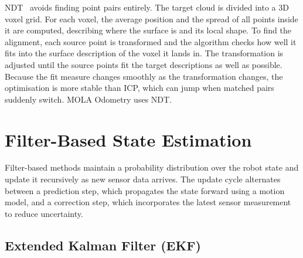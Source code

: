 NDT~\cite{biber2003ndt} avoids finding point pairs entirely.
The target cloud is divided into a 3D voxel grid.
For each voxel, the average position and the spread of all points inside it
are computed, describing where the surface is and its local shape.
To find the alignment, each source point is transformed and the algorithm
checks how well it fits into the surface description of the voxel it lands in.
The transformation is adjusted until the source points fit the target
descriptions as well as possible.
Because the fit measure changes smoothly as the transformation changes, the
optimisation is more stable than ICP, which can jump when matched pairs
suddenly switch.
MOLA Odometry uses NDT.

\section{Filter-Based State Estimation}
\label{sec:filters}

Filter-based methods maintain a probability distribution over the robot state
and update it recursively as new sensor data arrives.
The update cycle alternates between a prediction step, which propagates the
state forward using a motion model, and a correction step, which incorporates
the latest sensor measurement to reduce uncertainty.

\subsection{Extended Kalman Filter (EKF)}

